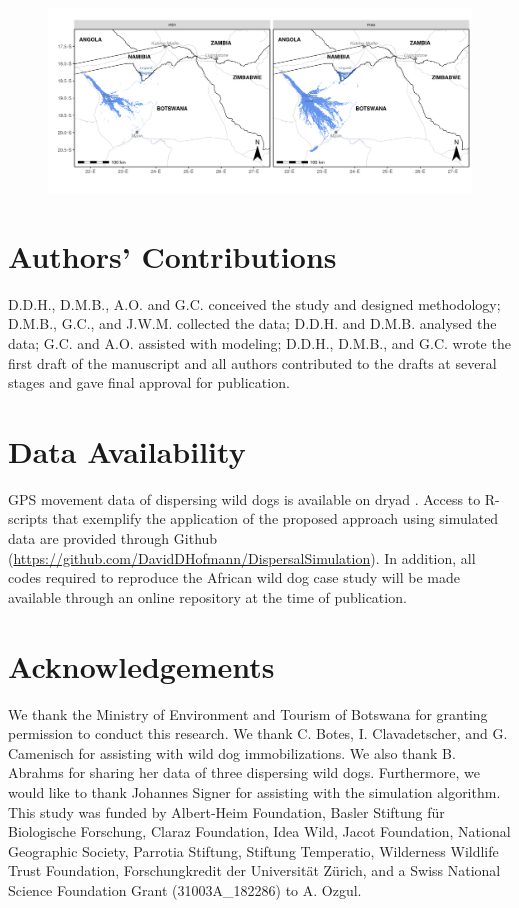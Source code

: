 \documentclass[abstract=on,10pt,a4paper,bibliography=totocnumbered]{article}
\begin{document}
\begin{figure}
  \begin{center}
  \includegraphics[width = \textwidth]{99_FloodExtent.png}
  \caption{}
  \label{FloodExtent}
  \end{center}
\end{figure}


\section{Authors' Contributions}
D.D.H., D.M.B., A.O. and G.C. conceived the study and designed methodology;
D.M.B., G.C., and J.W.M. collected the data; D.D.H. and D.M.B. analysed the
data; G.C. and A.O. assisted with modeling; D.D.H., D.M.B., and G.C. wrote the
first draft of the manuscript and all authors contributed to the drafts at
several stages and gave final approval for publication.

\section{Data Availability}
GPS movement data of dispersing wild dogs is available on dryad
\citep{Hofmann.2021b}. Access to R-scripts that exemplify the application of the
proposed approach using simulated data are provided through Github
(\url{https://github.com/DavidDHofmann/DispersalSimulation}). In addition, all
codes required to reproduce the African wild dog case study will be made
available through an online repository at the time of publication.

\section{Acknowledgements}
We thank the Ministry of Environment and Tourism of Botswana for granting
permission to conduct this research. We thank C. Botes, I. Clavadetscher, and G.
Camenisch for assisting with wild dog immobilizations. We also thank B. Abrahms
for sharing her data of three dispersing wild dogs. Furthermore, we would like
to thank Johannes Signer for assisting with the simulation algorithm. This study
was funded by Albert-Heim Foundation, Basler Stiftung für Biologische Forschung,
Claraz Foundation, Idea Wild, Jacot Foundation, National Geographic Society,
Parrotia Stiftung, Stiftung Temperatio, Wilderness Wildlife Trust Foundation,
Forschungkredit der Universität Zürich, and a Swiss National Science Foundation
Grant (31003A\_182286) to A. Ozgul.

\newpage
\begingroup
\singlespacing

\endgroup
\end{document}
